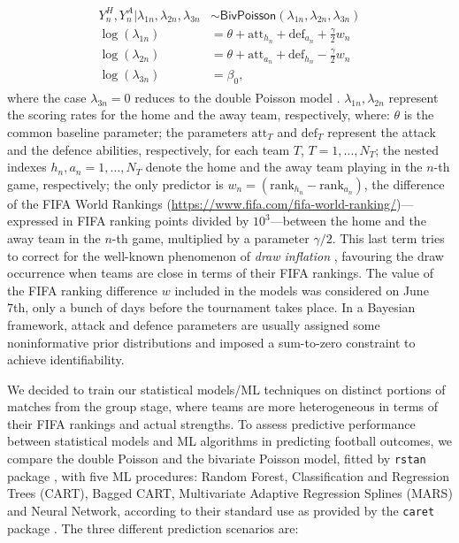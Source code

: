 \documentclass{statsoc}
\begin{document}
\begin{eqnarray}
\begin{split}
Y^H_n, Y^A_n| \lambda_{1n}, \lambda_{2n}, \lambda_{3n} & \sim \mathsf{BivPoisson}(\lambda_{1n}, \lambda_{2n}, \lambda_{3n})\\ 
\log(\lambda_{1n}) & = \theta+\text{att}_{h_n}+\text{def}_{a_n}+\frac{\gamma}{2} w_n\\
\log(\lambda_{2n}) & = \theta+\text{att}_{a_n}+\text{def}_{h_n}-\frac{\gamma}{2} w_n\\
\log(\lambda_{3n}) & =\beta_0,
\end{split}
\label{eq:bivariate}
\end{eqnarray}
where the case $\lambda_{3n}=0$ reduces to the double Poisson model \citep{baio2010bayesian}.  $\lambda_{1n}, \lambda_{2n}$ represent the scoring rates for the home and the away team, respectively, where: $\theta$ is the common baseline parameter; the parameters $\text{att}_T$ and $\text{def}_T$ represent the attack and the defence abilities, 
respectively, for each team $T$, $T=1,\ldots,N_T$; the nested indexes $h_{n}, a_{n}=1,\ldots,N_T$ denote the home and the away team playing in the $n$-th game, 
respectively; the only predictor is $w_n= (\text{rank}_{h_n}- \text{rank}_{a_n} )$, the difference of the FIFA World Rankings (\url{https://www.fifa.com/fifa-world-ranking/})---expressed in FIFA ranking points divided by $10^3$---between the home and the away team in 
the $n$-th game, multiplied by a parameter ${\gamma}/{2}$.  This last term tries to correct for the well-known phenomenon of \emph{draw inflation} \citep{karlis2003analysis}, 
favouring the draw occurrence when teams are close in terms of their FIFA rankings. The value of the 
FIFA ranking difference $w$ included in the models was considered on June 7th, only a bunch 
of days before the tournament takes place.  In a Bayesian framework, attack and defence parameters are usually assigned some noninformative prior distributions \citep{baio2010bayesian} and imposed a sum-to-zero constraint to achieve identifiability.

 

We decided to train our statistical models/ML techniques on distinct portions of matches from the group stage, where teams are more heterogeneous in terms of their FIFA rankings 
and actual strengths. To assess predictive performance between statistical models and ML algorithms in predicting football outcomes, we compare the double Poisson and the bivariate 
Poisson model, fitted by \texttt{rstan} package \citep{rstan}, with five ML procedures: Random Forest, Classification and Regression Trees (CART), Bagged CART, Multivariate 
Adaptive Regression Splines (MARS) and Neural Network, according to their standard use as provided by the \texttt{caret} package \citep{caret}.
The three different prediction scenarios are:
\end{document}
